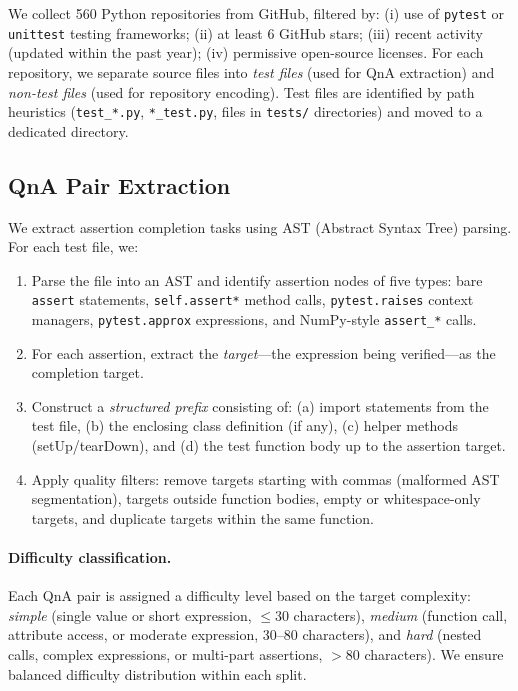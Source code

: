 \documentclass[11pt]{article}
\begin{document}
We collect 560 Python repositories from GitHub, filtered by:
(i) use of \texttt{pytest} or \texttt{unittest} testing frameworks;
(ii) at least 6 GitHub stars;
(iii) recent activity (updated within the past year);
(iv) permissive open-source licenses.
For each repository, we separate source files into \emph{test files} (used for QnA extraction) and \emph{non-test files} (used for repository encoding).
Test files are identified by path heuristics (\texttt{test\_*.py}, \texttt{*\_test.py}, files in \texttt{tests/} directories) and moved to a dedicated directory.

\subsection{QnA Pair Extraction}
\label{sec:qna_extraction}

We extract assertion completion tasks using AST (Abstract Syntax Tree) parsing.
For each test file, we:

\begin{enumerate}[nosep]
    \item Parse the file into an AST and identify assertion nodes of five types: bare \texttt{assert} statements, \texttt{self.assert*} method calls, \texttt{pytest.raises} context managers, \texttt{pytest.approx} expressions, and NumPy-style \texttt{assert\_*} calls.
    \item For each assertion, extract the \emph{target}---the expression being verified---as the completion target.
    \item Construct a \emph{structured prefix} consisting of: (a) import statements from the test file, (b) the enclosing class definition (if any), (c) helper methods (setUp/tearDown), and (d) the test function body up to the assertion target.
    \item Apply quality filters: remove targets starting with commas (malformed AST segmentation), targets outside function bodies, empty or whitespace-only targets, and duplicate targets within the same function.
\end{enumerate}

\paragraph{Difficulty classification.}
Each QnA pair is assigned a difficulty level based on the target complexity:
\emph{simple} (single value or short expression, $\leq 30$ characters),
\emph{medium} (function call, attribute access, or moderate expression, 30--80 characters), and
\emph{hard} (nested calls, complex expressions, or multi-part assertions, $>$80 characters).
We ensure balanced difficulty distribution within each split.
\end{document}
